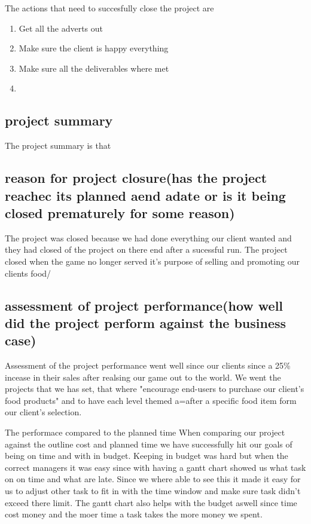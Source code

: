 \documentclass{article}
\begin{document}
The actions that need to succesfully close the project are
\begin{enumerate}
	\item Get all the adverts out 
	\item Make sure the client is happy everything
	\item Make sure all the deliverables where met
	\item 
\end{enumerate}

\subsection{project summary}
The project summary is that 


\subsection{reason for project closure(has the project reachec its planned aend adate or is it being closed prematurely for some reason)}
The project was closed because we had done everything our client wanted and they had closed of the project on there end after a sucessful run. The project closed when the game no longer served it's purpose of selling and promoting our clients food/


\subsection{assessment of project performance(how well did the project perform against the business case)}
Assessment of the project performance went well since our clients since a 25\% incease in their sales after realsing our game out to the world. We went the projects that we has set, that where "encourage end-users to purchase our client's food products" and to have each level themed a=after a specific food item form our client's selection. 

The performace compared to the planned time 
When comparing our project against the outline cost and planned time we have successfully hit our goals of being on time and with in budget. Keeping in budget was hard but when the correct managers it was easy since with having a gantt chart showed us what task on on time and what are late. Since we where able to see this it made it easy for us to adjust other task to fit in with the time window and make sure task didn't exceed there limit. The gantt chart also helps with the budget aswell since time cost money and the moer time a task takes the more money we spent.
\end{document}

